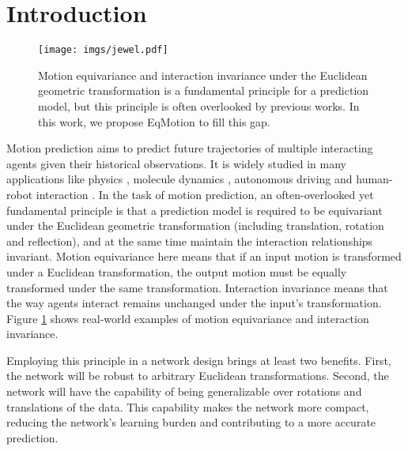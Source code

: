 \documentclass[10pt,twocolumn,letterpaper]{article}
\begin{document}
\section{Introduction}


\begin{figure}[t] 
\centering
\texttt{[image: imgs/jewel.pdf]}
\vspace{-3mm}
\caption{\small Motion equivariance and interaction invariance under the Euclidean
geometric transformation is a fundamental principle for a prediction model, but this principle is often overlooked by previous works. In this work, we propose EqMotion to fill this gap.}
\label{fig:jewel}
\vspace{-4mm}
\end{figure}

Motion prediction aims to predict future trajectories of multiple interacting agents given their historical observations. It is widely studied in many applications like physics \cite{battaglia2016interaction, kipf2018neural}, molecule dynamics \cite{chmiela2017machine}, autonomous driving \cite{levinson2011towards} and human-robot interaction \cite{li2019actional,xu2021invariant}.
In the task of motion prediction, an often-overlooked yet fundamental principle is that a prediction model is required to be equivariant under the Euclidean geometric transformation (including translation, rotation and reflection), and at the same time maintain the interaction relationships invariant. 
Motion equivariance here means that if an input motion is transformed under a Euclidean transformation, the output motion must be equally transformed under the same transformation. Interaction invariance means that the way agents interact remains unchanged under the input's transformation. Figure \ref{fig:jewel} shows real-world examples of motion equivariance and interaction invariance.


Employing this principle in a network design brings at least two benefits. First, the network will be robust to arbitrary Euclidean transformations. Second, the network will have the capability of being generalizable over rotations and translations of the data. This capability makes the network more compact, reducing the network's learning burden and contributing to a more accurate prediction. 
\end{document}
